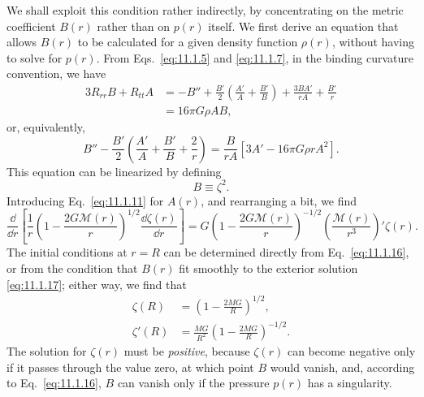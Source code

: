 We shall exploit this condition rather indirectly, by concentrating on the
metric coefficient \(B(r)\) rather than on \(p(r)\) itself. We first derive
an equation that allows \(B(r)\) to be calculated for a given density
function \(\rho(r)\), without having to solve for \(p(r)\). From
Eqs.~\eqref{eq:11.1.5} and \eqref{eq:11.1.7}, in the binding curvature
convention, we have
\[
  \begin{aligned}
  3R_{rr}B+R_{tt}A
  &=
  -B''
  +\frac{B'}2\left(\frac{A'}A+\frac{B'}B\right)
  +\frac{3BA'}{rA}+\frac{B'}r\\
  &=
  16\pi G\rho AB,
  \end{aligned}
\]
or, equivalently,
\[
  B''
  -\frac{B'}2
  \left(\frac{A'}A+\frac{B'}B+\frac2r\right)
  =
  \frac{B}{rA}\left[3A'-16\pi G\rho rA^2\right].
\]
This equation can be linearized by defining
\begin{equation}
  B\equiv\zeta^2.
  \tag{11.6.13}\label{eq:11.6.13}
\end{equation}
Introducing Eq.~\eqref{eq:11.1.11} for \(A(r)\), and rearranging a bit, we
find
\begin{equation}
  \frac{\dd}{\dd r}
  \left[
    \frac1r
    \left(1-\frac{2G\mathcal{M}(r)}r\right)^{1/2}
    \frac{\dd\zeta(r)}{\dd r}
  \right]
  =
  G
  \left(1-\frac{2G\mathcal{M}(r)}r\right)^{-1/2}
  \left(\frac{\mathcal{M}(r)}{r^3}\right)'
  \zeta(r).
  \tag{11.6.14}\label{eq:11.6.14}
\end{equation}
The initial conditions at \(r=R\) can be determined directly from
Eq.~\eqref{eq:11.1.16}, or from the condition that \(B(r)\) fit smoothly to
the exterior solution \eqref{eq:11.1.17}; either way, we find that
\begin{align}
  \zeta(R)
  &=
  \left(1-\frac{2MG}{R}\right)^{1/2},
  \tag{11.6.15}\label{eq:11.6.15}\\
  \zeta'(R)
  &=
  \frac{MG}{R^2}
  \left(1-\frac{2MG}{R}\right)^{-1/2}.
  \tag{11.6.16}\label{eq:11.6.16}
\end{align}
The solution for \(\zeta(r)\) must be \emph{positive}, because \(\zeta(r)\)
can become negative only if it passes through the value zero, at which point
\(B\) would vanish, and, according to Eq.~\eqref{eq:11.1.16}, \(B\) can
vanish only if the pressure \(p(r)\) has a singularity.


